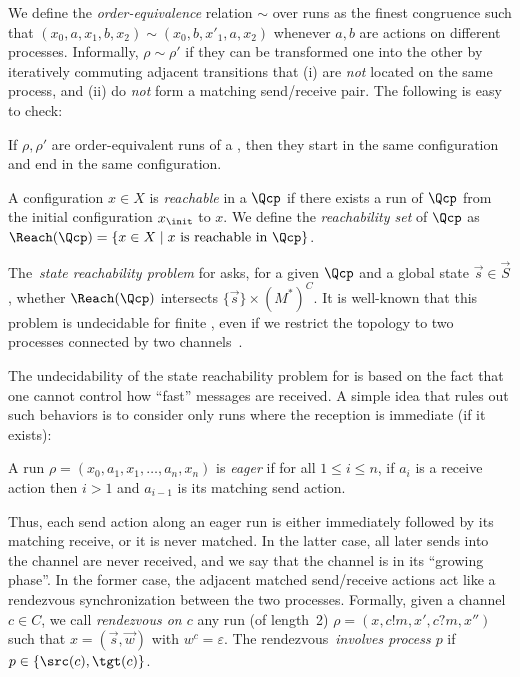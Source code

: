\documentclass{LMCS}
\newenvironment{definition}{\begin{defi}}{\end{defi}}
\begin{document}
We
define the \emph{order-equivalence} relation $\sim$ over runs as the
finest congruence such that $(x_0,a,x_1,b,x_2) \sim
(x_0,b,x'_1,a,x_2)$ whenever $a,b$  are actions on different processes.
Informally, $\rho \sim \rho'$ if they can be
transformed one into the other by iteratively commuting adjacent
transitions that (i) are \emph{not} located on the same
process, and (ii) do \emph{not} form a matching send/receive pair.
The following is easy to check:

\begin{fact}
  If $\rho,\rho'$ are order-equivalent runs of a \qcp, then
  they start in the same configuration and end in the same configuration.
\end{fact}

\medskip

A configuration $x\in X$ is \emph{reachable} in a \qcp $\Qcp$ if there
exists a run of $\Qcp$ from the initial configuration $x_\init$ to
$x$.  We define the \emph{reachability set} of $\Qcp$ as
$\Reach(\Qcp)=\{x \in X \mid x \text{ is reachable in } \Qcp\}$.

\smallskip

The~\emph{state reachability problem} for \qcp asks, for a given \qcp
$\Qcp$ and a global state $\vec{s} \in \vec{S}$, whether 
$\Reach(\Qcp)$ intersects
$\{\vec{s}\} \times (M^*)^C$.  It is well-known that this problem is
undecidable for finite \qcp, even if we restrict the
topology to two
processes connected by two channels~\cite{brand-d-1983-323-a}.













The undecidability of the state reachability problem for \qcp is based on
the fact that one cannot control how ``fast'' messages are received.
A simple idea that rules out such behaviors is to consider only runs
where the reception is immediate (if it exists):

\begin{definition}
  A run $\rho=(x_0,a_1,x_1,\ldots,a_n,x_n)$ is \emph{eager} if for all
  $1 \leq i \leq n$, if $a_i$ is a receive action then $i > 1$ and
  $a_{i-1}$ is its matching send action. \label{def:bounded_run}
\end{definition}
Thus, each send action along an eager run is either immediately
followed by its matching receive, or it is never matched.  In
the latter case, all later sends into the channel are never received,
and we say that the channel is in its ``growing phase''.  In the
former case, the adjacent matched send/receive actions act like a
rendezvous synchronization between the two processes.  Formally, given
a channel $c \in C$, we call \emph{rendezvous on $c$} any run (of
length~2) $\rho = (x, c!m, x', c?m, x'')$ such that $x= (\vec{s},
\vec{w})$ with $w^c = \varepsilon$. The rendezvous~\emph{involves
  process $p$} if $p \in \{\src(c),\tgt(c)\}$.
\end{document}
